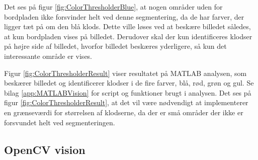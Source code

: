 Det ses på figur \vref{fig:ColorThresholderBlue}, at nogen områder uden for bordpladen ikke forsvinder helt ved denne segmentering, da de har farver, der ligger tæt på om den blå klods.
Dette ville løses ved at beskære billedet således, at kun bordpladen vises på billedet.
Derudover skal der kun identificeres klodser på højre side af billedet, hvorfor billedet beskæres yderligere, så kun det interessante område er vises.

Figur \vref{fig:ColorThresholderResult} viser resultatet på MATLAB analysen, som beskærer billedet og identificerer klodser i de fire farver, blå, rød, grøn og gul.
Se bilag \vref{app:MATLABVision} for script og funktioner brugt i analysen.
Det ses på figur \vref{fig:ColorThresholderResult}, at det vil være nødvendigt at implementerer en grænseværdi for størrelsen af klodserne, da der er små områder der ikke er forsvundet helt ved segmenteringen.


\subsection{OpenCV vision}